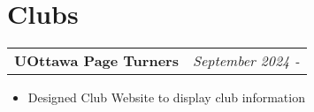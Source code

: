 \documentclass[a4paper,12pt]{article}
\begin{document}









\section{Clubs}


\begin{tabularx}{\linewidth}{ @{}X r@{} }
    {\textbf{UOttawa Page Turners}}  & \textit{September 2024 - } \\
\end{tabularx}
\begin{itemize}[nosep,leftmargin=*]
        \item Designed Club Website to display club information 
\end{itemize}
\vfill
\end{document}
